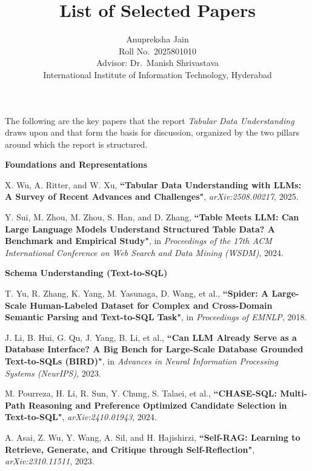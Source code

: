 \documentclass[11pt]{article}
\title{\vspace{-1.5cm}List of Selected Papers}
\author{Anupreksha Jain \\ \small Roll No.\ 2025801010 \\ \small Advisor: Dr.\ Manish Shrivastava \\ \small International Institute of Information Technology, Hyderabad}
\date{}
\begin{document}
\maketitle
\vspace{-0.8cm}

The following are the key papers that the report \emph{Tabular Data Understanding} draws upon and that form the basis for discussion, organized by the two pillars around which the report is structured.

\vspace*{0.3cm}
\noindent\textbf{Foundations and Representations}
\begin{enumerate}[label={[S\arabic*]}]
    \item X. Wu, A. Ritter, and W. Xu, \textbf{``Tabular Data Understanding with LLMs: A Survey of Recent Advances and Challenges"}, {\it arXiv:2508.00217}, 2025.

    \item Y. Sui, M. Zhou, M. Zhou, S. Han, and D. Zhang, \textbf{``Table Meets LLM: Can Large Language Models Understand Structured Table Data? A Benchmark and Empirical Study"}, in {\it Proceedings of the 17th ACM International Conference on Web Search and Data Mining (WSDM)}, 2024.
\end{enumerate}

\vspace*{0.2cm}
\noindent\textbf{Schema Understanding (Text-to-SQL)}
\begin{enumerate}[start=3,label={[S\arabic*]}]
    \item T. Yu, R. Zhang, K. Yang, M. Yasunaga, D. Wang, et al., \textbf{``Spider: A Large-Scale Human-Labeled Dataset for Complex and Cross-Domain Semantic Parsing and Text-to-SQL Task"}, in {\it Proceedings of EMNLP}, 2018.

    \item J. Li, B. Hui, G. Qu, J. Yang, B. Li, et al., \textbf{``Can LLM Already Serve as a Database Interface? A Big Bench for Large-Scale Database Grounded Text-to-SQLs (BIRD)"}, in {\it Advances in Neural Information Processing Systems (NeurIPS)}, 2023.

    \item M. Pourreza, H. Li, R. Sun, Y. Chung, S. Talaei, et al., \textbf{``CHASE-SQL: Multi-Path Reasoning and Preference Optimized Candidate Selection in Text-to-SQL"}, {\it arXiv:2410.01943}, 2024.

    \item A. Asai, Z. Wu, Y. Wang, A. Sil, and H. Hajishirzi, \textbf{``Self-RAG: Learning to Retrieve, Generate, and Critique through Self-Reflection"}, {\it arXiv:2310.11511}, 2023.
\end{enumerate}
\end{document}
